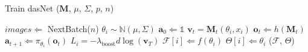 \begin{algorithm}[t]                      %
\caption{{\sc Train dasNet} ($\mathbf{M}$, $\mu$, $\Sigma$, $p$, $n$)}          %
\label{alg1}                           %
\begin{algorithmic}[1]                    %
\STATE $images \Leftarrow$ {\sc NextBatch}($n$)
        \STATE $\theta_i \sim \mathbb{N}(\mu, \Sigma)$
             \STATE $\mathbf{a}_0 \Leftarrow \mathds{1}$ 
                   \STATE $\mathbf{v}_t = \mathbf{M}_t(\theta_i, x_i)$
                   \STATE $\mathbf{o}_t \Leftarrow h(\mathbf{M}_t)$
                   \STATE $\mathbf{a}_{t+1} \Leftarrow \pi_{\theta_i}(\mathbf{o}_t)$
              \ENDFOR
              \STATE $L_i = -\lambda_{\text{boost}} d \log(\mathbf{v}_T)$
         \ENDFOR
         \STATE $\mathcal{F}[i] \Leftarrow f(\theta_i)$
         \STATE $\Theta[i] \Leftarrow \theta_i$
    \ENDFOR
        ($\mathcal{F}$, $\Theta$)
\ENDWHILE
\end{algorithmic}
\end{algorithm}

